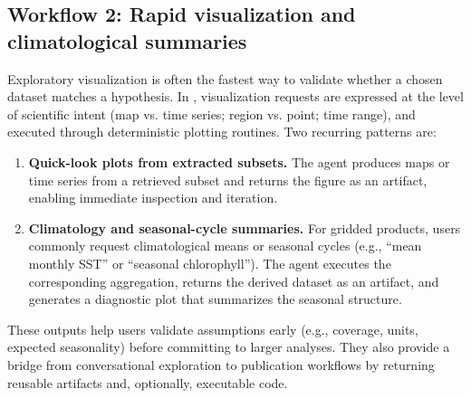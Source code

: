 \subsection{Workflow 2: Rapid visualization and climatological summaries}
Exploratory visualization is often the fastest way to validate whether a chosen dataset matches a hypothesis.
In \cmapagent, visualization requests are expressed at the level of scientific intent (map vs. time series; region vs. point; time range), and executed through deterministic plotting routines.
Two recurring patterns are:
\begin{enumerate}[leftmargin=*]
  \item \textbf{Quick-look plots from extracted subsets.} The agent produces maps or time series from a retrieved subset and returns the figure as an artifact, enabling immediate inspection and iteration.
  \item \textbf{Climatology and seasonal-cycle summaries.} For gridded products, users commonly request climatological means or seasonal cycles (e.g., ``mean monthly SST'' or ``seasonal chlorophyll'').
  The agent executes the corresponding aggregation, returns the derived dataset as an artifact, and generates a diagnostic plot that summarizes the seasonal structure.
\end{enumerate}
These outputs help users validate assumptions early (e.g., coverage, units, expected seasonality) before committing to larger analyses.
They also provide a bridge from conversational exploration to publication workflows by returning reusable artifacts and, optionally, executable code.

